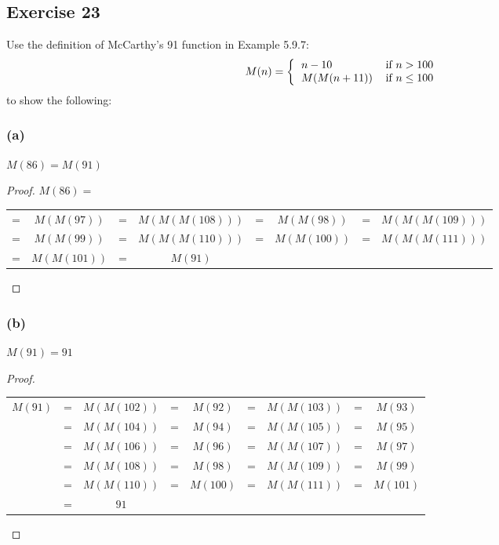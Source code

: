 \documentclass[14pt]{extarticle}
\begin{document}
\subsection{Exercise 23}
Use the definition of McCarthy’s 91 function in Example 5.9.7:
\[
    M(n) =
    \left\{
    \begin{tabular}{lr}
        $n - 10$       & if \(n > 100\)    \\
        \(M(M(n+11))\) & if \(n \leq 100\)
    \end{tabular}
    \right.
\]
to show the following:

\subsubsection{(a)}
\(M(86) = M(91)\)

\begin{proof}
    $M(86) = $
    \begin{center}
        \begin{tabular}{cccccccc}
            = & \(M(M(97))\)  & = & \(M(M(M(108)))\) & = & \(M(M(98))\)  & = & \(M(M(M(109)))\) \\
            = & \(M(M(99))\)  & = & \(M(M(M(110)))\) & = & \(M(M(100))\) & = & \(M(M(M(111)))\) \\
            = & \(M(M(101))\) & = & \(M(91)\)        &   &               &   &
        \end{tabular}
    \end{center}
\end{proof}

\subsubsection{(b)}
\(M(91) = 91\)

\begin{proof}
    \begin{center}
        \begin{tabular}{ccccccccc}
            \(M(91)\) & = & \(M(M(102))\) & = & \(M(92)\)  & = & \(M(M(103))\) & = & \(M(93)\)  \\
                      & = & \(M(M(104))\) & = & \(M(94)\)  & = & \(M(M(105))\) & = & \(M(95)\)  \\
                      & = & \(M(M(106))\) & = & \(M(96)\)  & = & \(M(M(107))\) & = & \(M(97)\)  \\
                      & = & \(M(M(108))\) & = & \(M(98)\)  & = & \(M(M(109))\) & = & \(M(99)\)  \\
                      & = & \(M(M(110))\) & = & \(M(100)\) & = & \(M(M(111))\) & = & \(M(101)\) \\
                      & = & \(91\)        &   &            &   &               &   &
        \end{tabular}
    \end{center}
\end{proof}
\end{document}
